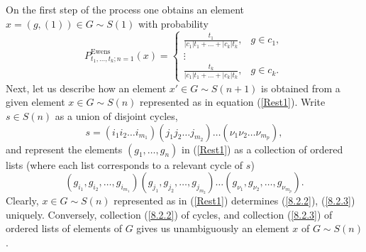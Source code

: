 \documentclass[12pt]{amsart}
\theoremstyle{definition}
\numberwithin{equation}{section}
\DeclareMathOperator{\Ewens}{Ewens}
\begin{document}
On the first step of the process one
obtains an element $x=(g,(1))\in G\sim S(1)$ with probability
$$
P^{\Ewens}_{t_1,\ldots,t_k; n=1}(x)
=
\left\{
  \begin{array}{ll}
    \frac{t_1}{|c_1|t_1+\ldots+|c_k|t_k}, & g\in c_1, \\
    \vdots &  \\
    \frac{t_k}{|c_1|t_1+\ldots+|c_k|t_k}, & g\in c_k.
  \end{array}
\right.
$$
Next, let us describe how an element $x'\in G\sim S(n+1)$ is obtained from a given element $x\in G\sim S(n)$
represented  as in equation (\ref{Rest1}).
Write $s\in S(n)$ as a union of disjoint cycles,
\begin{equation}\label{8.2.2}
s=\left(i_1i_2\ldots i_{m_1}\right)\left(j_1j_2\ldots j_{m_2}\right)
\ldots\left(\nu_1\nu_2\ldots \nu_{m_p}\right),
\end{equation}
and represent the elements $(g_1, \ldots, g_n)$ in (\ref{Rest1}) as a collection of ordered lists (where each list corresponds to a relevant cycle of $s$)
\begin{equation}\label{8.2.3}
\left(g_{i_1},g_{i_2},\ldots, g_{i_{m_1}}\right)\left(g_{j_1},g_{j_2},\ldots, g_{j_{m_2}}\right)
\ldots\left(g_{\nu_1},g_{\nu_2},\ldots, g_{\nu_{m_p}}\right).
\end{equation}
Clearly, $x\in G\sim S(n)$ represented as in (\ref{Rest1}) determines
(\ref{8.2.2}), (\ref{8.2.3}) uniquely. Conversely,
collection (\ref{8.2.2}) of cycles, and collection (\ref{8.2.3})
of ordered lists of elements of $G$ gives us unambiguously
an element $x$ of $G\sim S(n)$.
\end{document}
